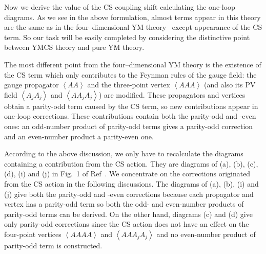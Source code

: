 \documentclass[a4paper,12pt]{article}
\begin{document}

Now we derive the value of the CS coupling shift
calculating the one-loop diagrams.
%
As we see in the above formulation,
almost terms appear in this theory are the same as
in the four--dimensional YM theory~\cite{Nittoh:2000it}
except appearance of the CS term.
%
So our task will be easily completed
by considering the distinctive point between
YMCS theory and pure YM theory.

The most different point from the four--dimensional YM theory is
the existence of the CS term
which only contributes to the Feynman rules of the gauge field:
the gauge propagator $\left<AA\right>$
and the three-point vertex $\left<AAA\right>$
(and also its PV field $\left<A_jA_j\right>$
and $\left<AA_jA_j\right>$) are modified.
%
These propagators and vertices obtain a parity-odd term
caused by the CS term,
so new contributions appear in one-loop corrections.
%
These contributions contain both the parity-odd and -even ones:
an odd-number product of parity-odd terms gives a parity-odd correction
and an even-number product a parity-even one.
%




According to the above discussion,
we only have to recalculate the diagrams containing a contribution
from the CS action.
%
They are diagrams of (a), (b), (c), (d), (i) and (j) in Fig.~1
of Ref~\cite{Nittoh:2000it}.
%
We concentrate on the corrections originated from the CS action
in the following discussions.
%
%
The diagrams of (a), (b), (i) and (j) give
both the parity-odd and -even corrections
because each propagator and vertex has a parity-odd term
so both the odd- and even-number products of parity-odd terms
can be derived.
%
On the other hand,
diagrams (c) and (d) give only parity-odd corrections
since the CS action does not have an effect on the four-point vertices
$\left< AAAA \right>$ and $\left< AAA_jA_j \right>$
and no even-number product of parity-odd term is constructed.
\end{document}
